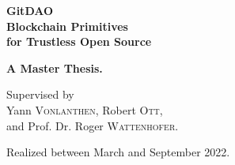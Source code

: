 \begin{titlepage}
  \symmetricalPage%
  \begingroup%
    \tikzset{external/export=false}%
  \endgroup%
  \sffamily%

  \vspace*{2cm}%
  \begingroup%
    \bfseries%
    \begingroup%
      \Huge%
      \color{gray_30}
      GitDAO\\[8mm]
    \endgroup%
    \begingroup%
      \huge%
      \color{gray_30}%
      Blockchain Primitives\\[2mm]
      for Trustless Open Source%
    \endgroup%
  \endgroup%

  \vfill%
  \parbox[b]{\linewidth-6cm}{%
    \begingroup%
      \bfseries%
      \color{gray_90}%
      A Master Thesis.

      \vspace*{7mm}%
      Supervised by\\
      Yann \textsc{Vonlanthen}, Robert \textsc{Ott},\\
      and Prof. Dr. Roger \textsc{Wattenhofer}.
    \endgroup%
  }%
  \hfill%
  \parbox[b]{4cm}{%
    
  }
\end{titlepage}
\restoregeometry%

\pageBackground%
\marginElement{}
Realized between March and September 2022.

\null\vfill

\begingroup%
  \renewcommand{\strong}[1]{{\bfseries\textcolor{gray_20}{#1}}}

